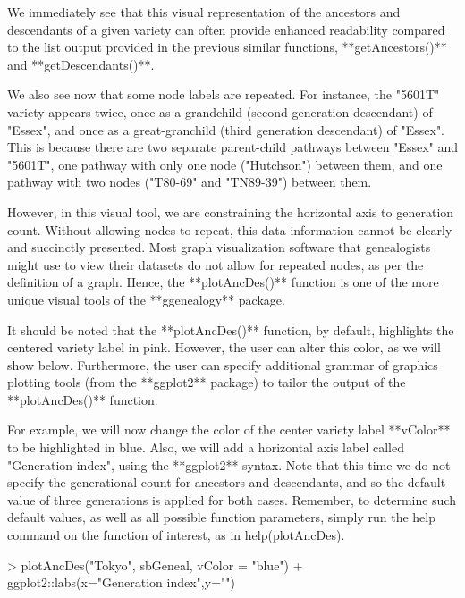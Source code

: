 \documentclass{article}
\numberwithin{equation}{section} %
\begin{document}
We immediately see that this visual representation of the ancestors and descendants of a given variety can often provide enhanced readability compared to the list output provided in the previous similar functions, **getAncestors()** and **getDescendants()**.

We also see now that some node labels are repeated. For instance, the "5601T" variety appears twice, once as a grandchild (second generation descendant) of "Essex", and once as a great-granchild (third generation descendant) of "Essex". This is because there are two separate parent-child pathways between "Essex" and "5601T", one pathway with only one node ("Hutchson") between them, and one pathway with two nodes ("T80-69" and "TN89-39") between them.

However, in this visual tool, we are constraining the horizontal axis to generation count. Without allowing nodes to repeat, this data information cannot be clearly and succinctly presented. Most graph visualization software that genealogists might use to view their datasets do not allow for repeated nodes, as per the definition of a graph. Hence, the **plotAncDes()** function is one of the more unique visual tools of the **ggenealogy** package.

It should be noted that the **plotAncDes()** function, by default, highlights the centered variety label in pink. However, the user can alter this color, as we will show below. Furthermore, the user can specify additional grammar of graphics plotting tools (from the **ggplot2** package) to tailor the output of the **plotAncDes()** function.

For example, we will now change the color of the center variety label **vColor** to be highlighted in blue. Also, we will add a horizontal axis label called "Generation index", using the **ggplot2** syntax. Note that this time we do not specify the generational count for ancestors and descendants, and so the default value of three generations is applied for both cases. Remember, to determine such default values, as well as all possible function parameters, simply run the help command on the function of interest, as in help(plotAncDes).

\begin{Schunk}
\begin{Sinput}
> plotAncDes("Tokyo", sbGeneal, vColor = "blue") + ggplot2::labs(x="Generation index",y="")
\end{Sinput}
\end{Schunk}
\end{document}
